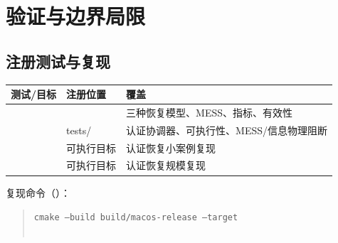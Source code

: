 \section{验证与边界局限}\label{sec:res-verify}

\subsection{注册测试与复现}
\begin{center}\footnotesize
\begin{tabular}{@{}L{5.6cm}L{4.0cm}L{5.0cm}@{}}
\toprule
测试/目标 & 注册位置 & 覆盖\\
\midrule
{} &  & 三种恢复模型、MESS、指标、有效性\\
 & tests/ & 认证协调器、可执行性、MESS/信息物理阻断\\
 & 可执行目标 & 认证恢复小案例复现\\
 & 可执行目标 & 认证恢复规模复现\\
\bottomrule
\end{tabular}
\end{center}
复现命令（）：
\begin{quote}\footnotesize
\texttt{cmake --build build/macos-release --target}\\
\\
\end{quote}

